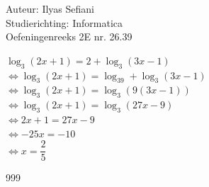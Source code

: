 \documentclass[a4paper]{article}
\begin{document}
\noindent \large Auteur: Ilyas Sefiani \\
\noindent \large Studierichting: Informatica\\
\noindent \large Oefeningenreeks 2E nr. 26.39\\

\medskip

\normalsize

$\log_3(2x+1) = 2+\log_3(3x-1)$\\

$\Leftrightarrow \log_3(2x+1) = \log_39+\log_3(3x-1)$\\

$\Leftrightarrow \log_3(2x+1) = \log_3(9(3x-1))$\\

$\Leftrightarrow \log_3(2x+1) = \log_3(27x-9)$\\

$\Leftrightarrow 2x+1 = 27x-9$\\

$\Leftrightarrow -25x = -10$\\

$\Leftrightarrow x = \dfrac{2}{5}$\\

\begin{thebibliography}{999}
\end{thebibliography}
\end{document}
